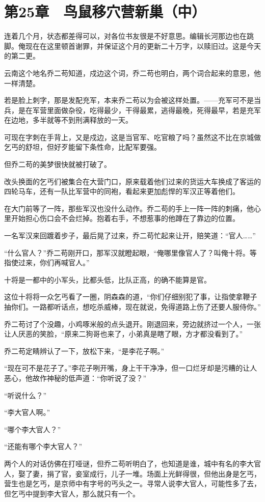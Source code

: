 \section{第25章　鸟鼠移穴营新巢（中）}

连着几个月，状态都差得可以，对各位书友很是不好意思。编辑长河那边也在跳脚。俺现在在这里顿首谢罪，并保证这个月的更新二十万字，以赎旧过。这是今天的第二更。

云南这个地名乔二苟知道，戍边这个词，乔二苟也明白，两个词合起来的意思，他一样清楚。

若是脸上刺字，那是发配充军，本来乔二苟以为会被这样处置。——充军可不是当兵，是在军营里面做杂役，吃得最少，干得最累，逃得最晚，死得最早，若是充军在边地，多半就等不到刑满释放的一天。

可现在字刺在手背上，又是戍边，这是当官军、吃官粮了吗？虽然这不比在京城做乞丐的舒坦，但好歹能留下条性命，比配军要强。

但乔二苟的美梦很快就被打破了。

改头换面的乞丐们被集合在大营门口，原来载着他们过来的货运大车换成了客运的四轮马车，还有一队比军营中的同袍，看起来更加彪悍的军汉正等着他们。

在大门前等了一阵，那些军汉也没什么动作。乔二苟的手上一阵一阵的刺痛，他心里开始担心伤口会不会烂掉。抱着右手，不想惹事的他蹲在了靠边的位置。

一名军汉来回踱着步子，最后晃了过来，乔二苟忙起来让开，赔笑道：“官人……”

“什么官人？”乔二苟刚开口，那军汉就瞪起眼，“俺哪里像官人了？叫俺十将。等指使过来，你们再喊官人。”

十将是一都中的小军头，比都头低，比队正高，的确不能算是官。

这位十将将一众乞丐看了一圈，阴森森的道，“你们仔细别犯了事，让指使拿鞭子抽你们。一路都听话点，想吃杀威棒，现在就说，免得道路上伤了还要人服侍你。”

乔二苟讨了个没趣，小鸡啄米般的点头退开。刚退回来，旁边就挤过一个人，一张让人厌恶的笑脸，“原来二狗哥也来了，小弟真是瞎了眼，方才都没看到了。”

乔二苟定睛辨认了一下，放松下来，“是李花子啊。”

“现在可不是花子了。”李花子咧开嘴，身上干干净净，但一口烂牙却是污糟的让人恶心，他故作神秘的低声道：“你听说了没？”

“听说什么？”

“李大官人啊。”

“哪个李大官人？”

“还能有哪个李大官人？”

两个人的对话仿佛在打哑谜，但乔二苟听明白了，也知道是谁，城中有名的李大官人，娶了妻，捐了官，妾室成行，儿子一堆。场面上光鲜得很，但他出身是乞丐，营生也是乞丐，是京师中有字号的丐头之一。寻常人说李大官人，可能性多了去，但乞丐中提到李大官人，那么就只有一个。

